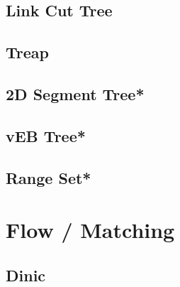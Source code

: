 \subsection{Link Cut Tree}

\subsection{Treap}

% 
\subsection{2D Segment Tree*}
% 
% 
\subsection{vEB Tree*}
\subsection{Range Set*}
% 

\section{Flow / Matching}
\subsection{Dinic}

